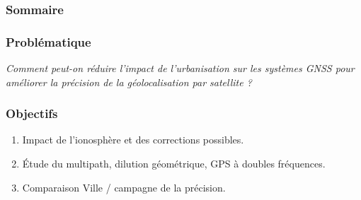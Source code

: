 \documentclass[xcolor=dvipsnames,envcountsect]{beamer}
\begin{document}
\begin{frame}{\frametitle{Sommaire}\tableofcontents}\end{frame}

\begin{frame}
	\frametitle{Problématique}
	\centering
	\begin{block}
		\scshape
			\begin{center}
				\Huge\emph{Comment peut-on réduire l'impact de l'urbanisation sur les systèmes GNSS pour améliorer la
				précision de la géolocalisation par satellite ?}
			\end{center}
	\end{block}
\end{frame}

\begin{frame}
	\frametitle{Objectifs}
	\justifying
	\begin{enumerate}
		\item Impact de l'ionosphère et des corrections possibles. \\
		\item Étude du multipath, dilution géométrique, GPS à doubles fréquences. \\
		\item Comparaison Ville / campagne de la précision.	
	\end{enumerate}
\end{frame}
\end{document}
